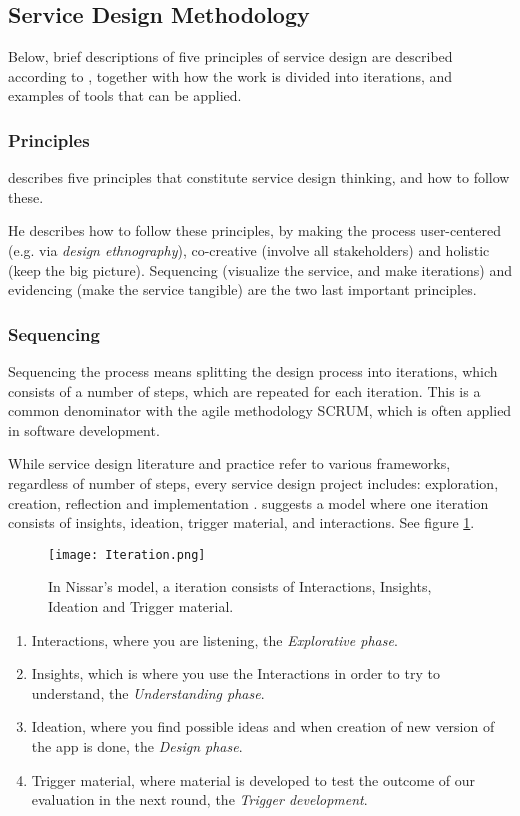 \subsection{Service Design Methodology}

Below, brief descriptions of five principles of service design are described according to \cite{stickdorn}, together with how the work is divided into iterations, and examples of tools that can be applied.

\subsubsection{Principles}
\cite{stickdorn} describes five principles that constitute service design thinking, and how to follow these.

He describes how to follow these principles, by making the process user-centered (e.g. via \textit{design ethnography}), co-creative (involve all stakeholders) and holistic (keep the big picture). Sequencing (visualize the service, and make iterations) and evidencing (make the service tangible) are the two last important principles.

\subsubsection{Sequencing}
Sequencing the process means splitting the design process into iterations, which consists of a number of steps, which are repeated for each iteration. This is a common denominator with the agile methodology SCRUM, which is often applied in software development.

While service design literature and practice refer to various frameworks, regardless of number of steps, every service design project includes: exploration, creation, reflection and implementation \citep{stickdorn}. \citep{expedition-mondial} suggests a model where one iteration consists of insights, ideation, trigger material, and interactions. See figure \ref{fig:iteration}.

\begin{figure}[h]
    \centering
    \texttt{[image: Iteration.png]}
    \caption{In Nissar's model, a iteration consists of Interactions, Insights, Ideation and Trigger material.}
    \label{fig:iteration}
\end{figure}

\begin{enumerate}
\item Interactions, where you are listening, the \textit{Explorative phase}.
\item Insights, which is where you use the Interactions in order to try to understand, the \textit{Understanding phase}. %
\item Ideation, where you find possible ideas and when creation of new version of the app is done, the \textit{Design phase}.
\item Trigger material, where material is developed to test the outcome of our evaluation in the next round, the \textit{Trigger development}.
\end{enumerate}

